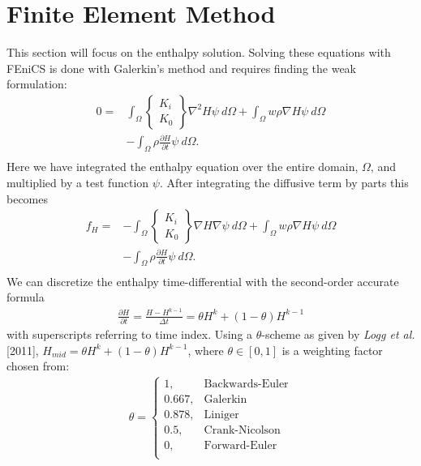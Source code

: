 \documentclass{article}%
\begin{document}
\section{Finite Element Method}

This section will focus on the enthalpy solution.  Solving these equations with FEniCS is done with Galerkin's method and requires finding the weak formulation:
\begin{align*}
    0 =
    &\int_{\Omega} 
      \begin{Bmatrix}
        K_i\\
        K_0
      \end{Bmatrix}
      \nabla^2 H \psi\ d \Omega 
    + \int_{\Omega}w \rho \nabla H \psi\ d \Omega \\
    &- \int_{\Omega} {\rho \frac{\partial H}{\partial t}} \psi\ d \Omega. \\
\end{align*}
Here we have integrated the enthalpy equation over the entire domain, $\Omega$, and multiplied by a test function $\psi$.  After integrating the diffusive term by parts this becomes
\begin{align*}
    f_H =
    &- \int_{\Omega} 
        \begin{Bmatrix}
          K_i\\
          K_0
        \end{Bmatrix}
        \nabla H \nabla \psi\ d \Omega 
    + \int_{\Omega}w \rho \nabla H \psi\ d \Omega \\
    &- \int_{\Omega} {\rho \frac{\partial H}{\partial t}} \psi\ d \Omega. \\
\end{align*}
We can discretize the enthalpy time-differential with the second-order accurate formula
\begin{align*}
  \frac{\partial H}{\partial t} = \frac{H - H^{k-1}}{\Delta t} = \theta H^{k}  + (1-\theta) H^{k-1}
\end{align*}
with superscripts referring to time index.  Using a $\theta$-scheme as given by \emph{Logg et al.} [2011], $H_{mid} = \theta H^{k}  + (1-\theta) H^{k-1}$, where $\theta \in [0,1]$ is a weighting factor chosen from: 
\begin{align*}
    \theta = 
    \begin{cases}
      1,       & \text{Backwards-Euler}\\
      0.667,   & \text{Galerkin}\\
      0.878,   & \text{Liniger}\\
      0.5,     & \text{Crank-Nicolson}\\
      0,       & \text{Forward-Euler}\\
    \end{cases}
\end{align*}
\end{document}
